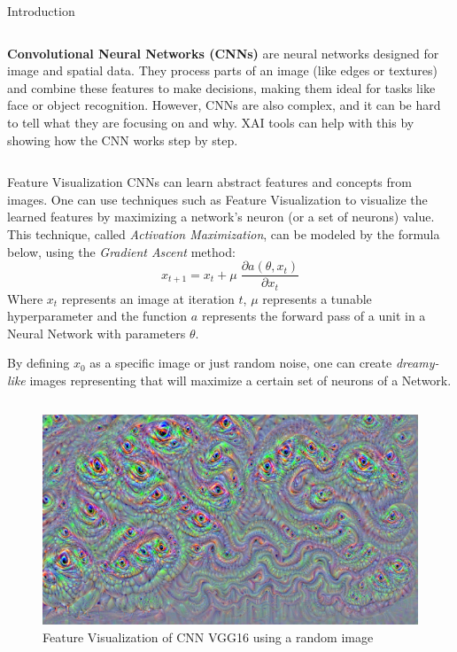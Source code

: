 \documentclass[final]{beamer}
\newlength{\colwidth}
\begin{document}
\begin{frame}[t]
\begin{columns}[t]
\begin{column}{\colwidth}
\begin{block}{Introduction}
\begin{columns}
      \begin{column}{0.4\textwidth}        
        
        \textbf{Convolutional Neural Networks (CNNs)} are neural networks designed for image and spatial data. They process parts of an image (like edges or textures) and combine these features to make decisions, making them ideal for tasks like face or object recognition.
        However, CNNs are also complex, and it can be hard to tell what they are focusing on and why. 
        XAI tools can help with this by showing how the CNN works step by step.
      \end{column}
    
    \end{columns}
  \end{block}

  \begin{block}{Feature Visualization}
    CNNs can learn abstract features and concepts from images. 
    One can use techniques such as Feature Visualization to visualize the learned features by maximizing a network's neuron (or a set of neurons) value.
    This technique, called \emph{Activation Maximization}, can be modeled by the formula below, using the \emph{Gradient Ascent} method:
    \[x_{t + 1} = x_{t} + \mu \;\frac{\partial a(\theta, x_t)}{\partial x_t}\]
    Where \(x_t\) represents an image at iteration \(t\), \(\mu\) represents a tunable hyperparameter and the function \(a\) represents the forward pass of a unit in a Neural Network with parameters \(\theta\).
    
    By defining \(x_0\) as a specific image or just random noise, one can create \emph{dreamy-like} \cite{deepdream} images representing that will maximize a certain set of neurons of a Network.
    \begin{columns}  
      \begin{column}{0.5\textwidth}
        \begin{figure}
          \centering
          \includegraphics[width=\linewidth]{images/random_image_dream.png}
          \caption{Feature Visualization of CNN VGG16 using a random image}
        \end{figure}  
      \end{column}


\end{columns}
\end{block}
\end{column}
\end{columns}
\end{frame}
\end{document}
